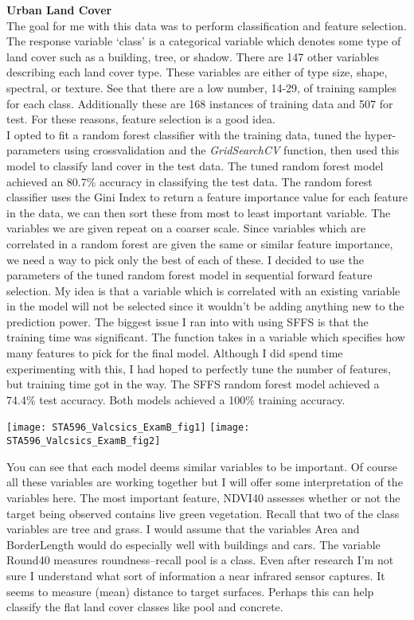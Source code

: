 \documentclass[10pt]{article}
\begin{document}
\textbf{ Urban Land Cover} \\

The goal for me with this data was to perform classification and feature selection. The response variable `class' is a categorical variable which denotes some type of land cover such as a building, tree, or shadow. There are 147 other variables describing each land cover type. These variables are either of type size, shape, spectral, or texture. See that there are a low number, 14-29, of training samples for each class. Additionally these are 168 instances of training data and 507 for test. For these reasons, feature selection is a good idea. \\

I opted to fit a random forest classifier with the training data, tuned the hyper-parameters using crossvalidation and the \textit{GridSearchCV} function, then used this model to classify land cover in the test data. The tuned random forest model achieved an 80.7\% accuracy in classifying the test data. The random forest classifier uses the Gini Index to return a feature importance value for each feature in the data, we can then sort these from most to least important variable. The variables we are given repeat on a coarser scale. Since variables which are correlated in a random forest are given the same or similar feature importance, we need a way to pick only the best of each of these. I decided to use the parameters of the tuned random forest model in sequential forward feature selection. My idea is that a variable which is correlated with an existing variable in the model will not be selected since it wouldn't be adding anything new to the prediction power. The biggest issue I ran into with using SFFS is that the training time was significant. The function takes in a variable which specifies how many features to pick for the final model. Although I did spend time experimenting with this, I had hoped to perfectly tune the number of features, but training time got in the way. The SFFS random forest model achieved a 74.4\% test accuracy. Both models achieved a 100\% training accuracy. 
\begin{center}
	\texttt{[image: STA596\_Valcsics\_ExamB\_fig1]}
	\texttt{[image: STA596\_Valcsics\_ExamB\_fig2]}
\end{center}
You can see that each model deems similar variables to be important. Of course all these variables are working together but I will offer some interpretation of the variables here. The most important feature, NDVI40 assesses whether or not the target being observed contains live green vegetation. Recall that two of the class variables are tree and grass. I would assume that the variables Area and BorderLength would do especially well with buildings and cars. The variable Round40 measures roundness--recall pool is a class. Even after research I'm not sure I understand what sort of information a near infrared sensor captures. It seems to measure (mean) distance to target surfaces. Perhaps this can help classify the flat land cover classes like pool and concrete. \\
\end{document}
